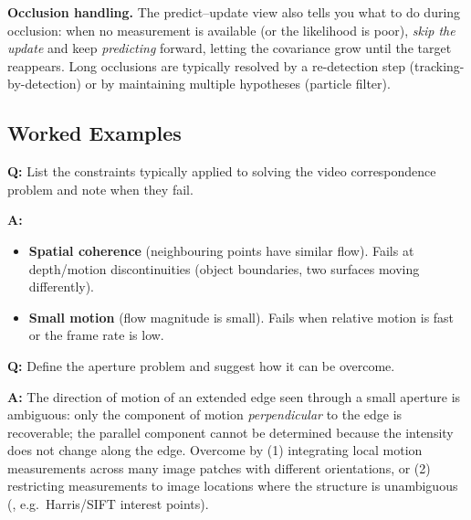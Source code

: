 \separator

\textbf{Occlusion handling.} The predict--update view also tells you what to do during occlusion: when no measurement is available (or the likelihood is poor), \emph{skip the update} and keep \emph{predicting} forward, letting the covariance grow until the target reappears. Long occlusions are typically resolved by a re-detection step (tracking-by-detection) or by maintaining multiple hypotheses (particle filter).

\bigseparator

\subsection{Worked Examples}

\begin{exbox}
\textbf{Q:} List the constraints typically applied to solving the video correspondence problem and note when they fail.

\textbf{A:}
\begin{itemize}
  \item \textbf{Spatial coherence} (neighbouring points have similar flow). Fails at depth/motion discontinuities (object boundaries, two surfaces moving differently).
  \item \textbf{Small motion} (flow magnitude is small). Fails when relative motion is fast or the frame rate is low.
\end{itemize}
\end{exbox}

\begin{exbox}
\textbf{Q:} Define the aperture problem and suggest how it can be overcome.

\textbf{A:} The direction of motion of an extended edge seen through a small aperture is ambiguous: only the component of motion \emph{perpendicular} to the edge is recoverable; the parallel component cannot be determined because the intensity does not change along the edge. Overcome by (1) integrating local motion measurements across many image patches with different orientations, or (2) restricting measurements to image locations where the structure is unambiguous (, e.g.\ Harris/SIFT interest points).
\end{exbox}

